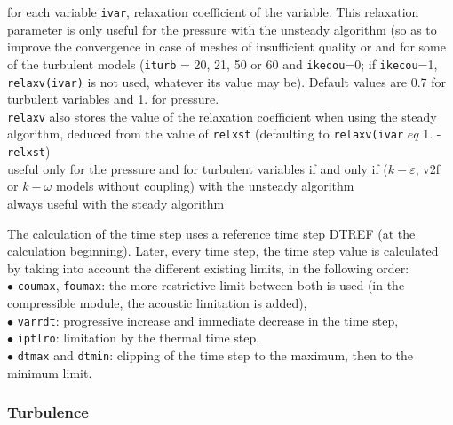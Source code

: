 {for each variable {\tt ivar}, relaxation coefficient of the variable.
This relaxation parameter is only useful for the pressure with the unsteady
algorithm (so as to improve the convergence in case of meshes of insufficient
quality or and for some of the turbulent models ({\tt iturb} = 20, 21,
50 or 60 and {\tt ikecou}=0; if {\tt ikecou}=1, {\tt relaxv(ivar)}
is not used, whatever its value may be). Default values are 0.7 for turbulent
variables and 1. for pressure.\\
{\tt relaxv} also stores the value of the relaxation coefficient when using the steady
algorithm, deduced from the value of {\tt relxst} (defaulting to
 {\tt relaxv(ivar} $eq$  {1. - \tt relxst})\\
useful only for the pressure and for turbulent variables
if and only if ($k-\varepsilon$, v2f or $k-\omega$ models without coupling)
 with the unsteady algorithm\\
always useful with the steady algorithm}


The calculation of the time step uses a reference time step DTREF (at
the calculation beginning). Later, every time step, the time step value
is calculated by taking into account the different existing limits, in
the following order: \\
\hspace*{1.cm}$\bullet$ {\tt coumax}, {\tt foumax}: the more restrictive limit between
both is used (in the compressible module, the acoustic limitation is added),\\
\hspace*{1.cm}$\bullet$ {\tt varrdt}:  progressive increase and immediate
decrease in the time step,\\
\hspace*{1.cm}$\bullet$ {\tt iptlro}: limitation by the thermal time step,\\
\hspace*{1.cm}$\bullet$ {\tt dtmax} and {\tt dtmin}: clipping of the time step to
the maximum, then to the minimum limit.\\


\subsubsection{Turbulence}

